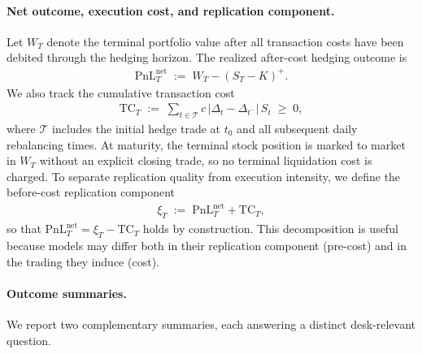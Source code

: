 \paragraph{Net outcome, execution cost, and replication component.}
Let $W_T$ denote the terminal portfolio value after all transaction costs have been debited through the hedging horizon.
The realized after-cost hedging outcome is
\begin{align}
\mathrm{PnL}_T^{\mathrm{net}} \;:=\; W_T - (S_T-K)^+ .
\label{eq:pi_net_def}
\end{align}
We also track the cumulative transaction cost
\begin{align}
\mathrm{TC}_T \;:=\; \sum_{t\in\mathcal{T}} c\,|\Delta_t-\Delta_{t^-}|\,S_t \;\ge\; 0 ,
\label{eq:ct_def}
\end{align}
where $\mathcal{T}$ includes the initial hedge trade at $t_0$ and all subsequent daily rebalancing times.
At maturity, the terminal stock position is marked to market in $W_T$ without an explicit closing trade, so no terminal liquidation cost is charged.
To separate replication quality from execution intensity, we define the before-cost replication component
\begin{align}
\xi_T \;:=\; \mathrm{PnL}_T^{\mathrm{net}} + \mathrm{TC}_T ,
\label{eq:eps_def}
\end{align}
so that $\mathrm{PnL}_T^{\mathrm{net}}=\xi_T-\mathrm{TC}_T$ holds by construction.
This decomposition is useful because models may differ both in their replication component (pre-cost) and in the trading they induce (cost).

\paragraph{Outcome summaries.}
We report two complementary summaries, each answering a distinct desk-relevant question.

